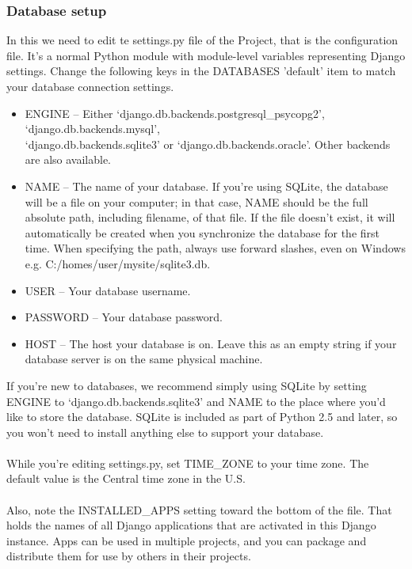\subsubsection{Database setup}
In this we need to edit te settings.py file of the Project, that is the 
configuration file. It's a normal Python module with module-level 
variables representing Django settings. Change the following keys in 
the DATABASES 'default' item to match your database connection 
settings.\\
\begin{itemize}
\item ENGINE -- Either `django.db.backends.postgresql\_psycopg2', 
`django.db.backends.mysql',\\ `django.db.backends.sqlite3' or 
`django.db.backends.oracle'. Other backends are also available.
\item NAME -- The name of your database. If you're using SQLite, 
the database will be a file on your computer; in that case, NAME 
should be the full absolute path, including filename, of that file. If 
the file doesn't exist, it will automatically be created when you 
synchronize the database for the first time. When specifying 
the path, always use forward slashes, even on Windows 
e.g. C:/homes/user/mysite/sqlite3.db. 
\item USER -- Your database username.
\item PASSWORD -- Your database password.
\item HOST -- The host your database is on. Leave this as an empty 
string if your database server is on the same physical machine.
\end{itemize}
If you're new to databases, we recommend simply using SQLite by setting 
ENGINE to `django.db.backends.sqlite3' and NAME to the place where 
you'd like to store the database. SQLite is included as part of Python 
2.5 and later, so you won't need to install anything else to support 
your database.\\\\
While you're editing settings.py, set TIME\_ZONE to your time zone. The 
default value is the Central time zone in the U.S.\\\\
Also, note the INSTALLED\_APPS setting toward the bottom of the file. 
That holds the names of all Django applications that are activated in 
this Django instance. Apps can be used in multiple projects, and you 
can package and distribute them for use by others in their projects.\\\\
